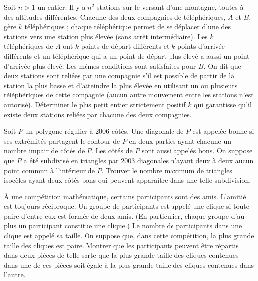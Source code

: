 \begin{exo}[P4 IMO 2021]
Soit $n > 1$ un entier. Il y a $n^2$ stations sur le versant d’une montagne, toutes à des altitudes différentes. Chacune des deux compagnies de téléphériques, $A$ et $B$, gère $k$ téléphériques ; chaque téléphérique permet de se déplacer d’une des stations vers une station plus élevée (sans arrêt intermédiaire). Les $k$ téléphériques de $A$ ont $k$ points de départ différents et $k$ points d’arrivée différents et un téléphérique qui a un point de départ plus élevé a aussi un point d’arrivée plus élevé. Les mêmes conditions sont satisfaites pour $B$. On dit que deux stations sont reliées par une compagnie s’il est possible de partir de la station la plus basse et d’atteindre la plus élevée en utilisant un ou plusieurs téléphériques de cette compagnie (aucun autre mouvement entre les stations n’est autorisé). Déterminer le plus petit entier strictement positif $ k$ qui garantisse qu’il existe deux stations reliées par chacune des deux compagnies.
\end{exo}



\begin{exo}[IMO 2006 P2]
Soit $P$ un polygone régulier à $2006$ côtés. Une diagonale de $P$ est appelée bonne si ses extrémités partagent le contour de $P$ en deux parties ayant chacune un nombre impair de côtés de $P$. Les côtés de $P$ sont aussi appelés bons. On suppose que $P$ a été subdivisé en triangles par 2003 diagonales n’ayant deux à deux aucun point commun à l’intérieur de $P$. Trouver le nombre maximum de triangles isocèles ayant deux côtés bons qui peuvent apparaître dans une telle subdivision.
\end{exo}


\begin{exo}[IMO 2007 P3]
À une compétition mathématique, certains participants sont des amis. L’amitié est toujours réciproque. Un groupe de participants est appelé une clique si toute paire d’entre eux est formée de deux amis. (En particulier, chaque groupe d’au plus un participant constitue une clique.) Le nombre de participants dans une clique est appelé sa taille. On suppose que, dans cette compétition, la plus grande taille des cliques est paire. Montrer que les participants peuvent être répartis dans deux pièces de telle sorte que la plus grande taille des cliques contenues dans une de ces pièces soit égale à la plus grande taille des cliques contenues dans l’autre.
\end{exo}


